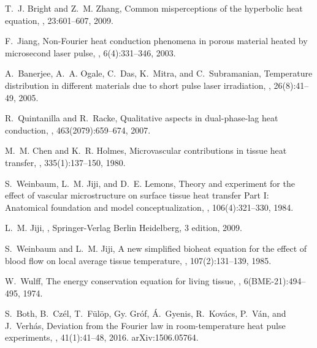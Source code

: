 \documentclass[sn-mathphys]{sn-jnl}%
\theoremstyle{thmstyleone}%
\theoremstyle{thmstyletwo}%
\theoremstyle{thmstylethree}%
\begin{document}
\begin{thebibliography}{9}
	T.~J. Bright and Z.~M. Zhang,
	\newblock Common misperceptions of the hyperbolic heat equation,
	, 23:601--607, 2009.
	
	F.~Jiang,
	\newblock Non-{F}ourier heat conduction phenomena in porous material heated by
	microsecond laser pulse,
	, 6(4):331--346, 2003.
	
	A.~Banerjee, A.~A. Ogale, C.~Das, K.~Mitra, and C.~Subramanian,
	\newblock Temperature distribution in different materials due to short pulse
	laser irradiation,
	, 26(8):41--49, 2005.
	
	R.~Quintanilla and R.~Racke,
	\newblock Qualitative aspects in dual-phase-lag heat conduction,
	, 463(2079):659--674, 2007.
	
	M.~M. Chen and K.~R. Holmes,
	\newblock Microvascular contributions in tissue heat transfer,
	, 335(1):137--150,
	1980.
	
	S.~Weinbaum, L.~M. Jiji, and D.~E. Lemons,
	\newblock Theory and experiment for the effect of vascular microstructure on
	surface tissue heat transfer {P}art {I}: {A}natomical foundation and model
	conceptualization,
	, 106(4):321--330, 1984.
	
	L.~M. Jiji,
	,
	\newblock Springer-Verlag Berlin Heidelberg, 3 edition, 2009.
	
	S.~Weinbaum and L.~M. Jiji,
	\newblock A new simplified bioheat equation for the effect of blood flow on local average tissue temperature,
	, 107(2):131--139, 1985.
	
	W.~Wulff,
	\newblock The energy conservation equation for living tissue,
	,
	6(BME-21):494--495, 1974.
	
	S.~Both, B.~Cz{\'e}l, T.~F{\"u}l{\"o}p, Gy. Gr{\'o}f, {\'A}.~Gyenis,
	R.~Kov{\'a}cs, P.~V{\'a}n, and J.~Verh{\'a}s,
	\newblock Deviation from the {F}ourier law in room-temperature heat pulse
	experiments,
	, 41(1):41--48, 2016.
	\newblock arXiv:1506.05764.
	

\end{thebibliography}
\end{document}
